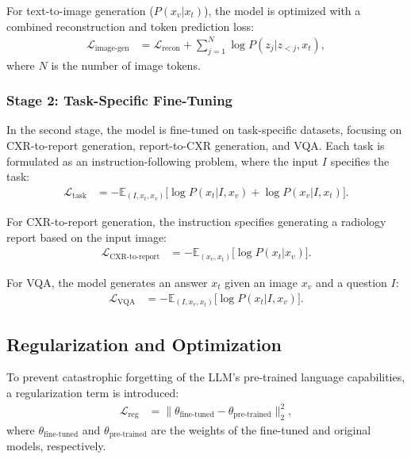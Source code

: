 For text-to-image generation (\(P(x_v | x_t)\)), the model is optimized with a combined reconstruction and token prediction loss:
\begin{align}
    \mathcal{L}_{\text{image-gen}} &= \mathcal{L}_{\text{recon}} + \sum_{j=1}^{N} \log P(z_j | z_{<j}, x_t),
\end{align}
where \( N \) is the number of image tokens.

\subsubsection{Stage 2: Task-Specific Fine-Tuning}

In the second stage, the model is fine-tuned on task-specific datasets, focusing on CXR-to-report generation, report-to-CXR generation, and VQA. Each task is formulated as an instruction-following problem, where the input \( I \) specifies the task:
\begin{align}
    \mathcal{L}_{\text{task}} &= - \mathbb{E}_{(I, x_t, x_v)} \big[ \log P(x_t | I, x_v) + \log P(x_v | I, x_t) \big].
\end{align}

For CXR-to-report generation, the instruction specifies generating a radiology report based on the input image:
\begin{align}
    \mathcal{L}_{\text{CXR-to-report}} &= - \mathbb{E}_{(x_v, x_t)} \big[ \log P(x_t | x_v) \big].
\end{align}

For VQA, the model generates an answer \( x_t \) given an image \( x_v \) and a question \( I \):
\begin{align}
    \mathcal{L}_{\text{VQA}} &= - \mathbb{E}_{(I, x_v, x_t)} \big[ \log P(x_t | I, x_v) \big].
\end{align}

\subsection{Regularization and Optimization}

To prevent catastrophic forgetting of the LLM's pre-trained language capabilities, a regularization term is introduced:
\begin{align}
    \mathcal{L}_{\text{reg}} &= \| \theta_{\text{fine-tuned}} - \theta_{\text{pre-trained}} \|_2^2,
\end{align}
where \( \theta_{\text{fine-tuned}} \) and \( \theta_{\text{pre-trained}} \) are the weights of the fine-tuned and original models, respectively.

